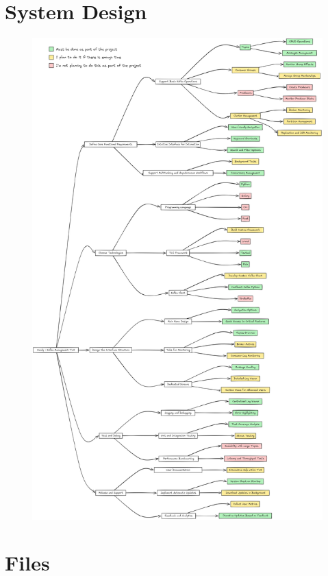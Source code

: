 \documentclass[10pt , a4paper]{report}
\begin{document}
\chapter{System Design}\label{appendix:system_design}
\begin{figure}[htpb]
    \centering
    \includegraphics[width=0.9\linewidth]{imgs/SystemDesign.png}
\end{figure}

\chapter{Files}
\end{document}
